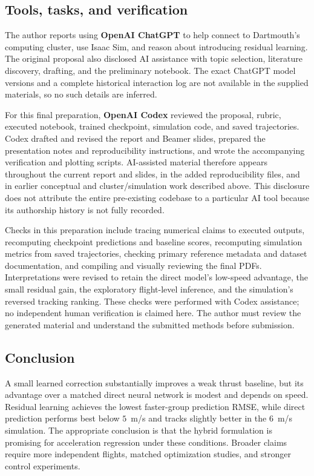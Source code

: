 \documentclass[10pt,letterpaper]{article}
\begin{document}
\subsection{Tools, tasks, and verification}
The author reports using \textbf{OpenAI ChatGPT} to help connect to Dartmouth's computing cluster, use Isaac Sim, and reason about introducing residual learning. The original proposal also disclosed AI assistance with topic selection, literature discovery, drafting, and the preliminary notebook. The exact ChatGPT model versions and a complete historical interaction log are not available in the supplied materials, so no such details are inferred.

For this final preparation, \textbf{OpenAI Codex} reviewed the proposal, rubric, executed notebook, trained checkpoint, simulation code, and saved trajectories. Codex drafted and revised the report and Beamer slides, prepared the presentation notes and reproducibility instructions, and wrote the accompanying verification and plotting scripts. AI-assisted material therefore appears throughout the current report and slides, in the added reproducibility files, and in earlier conceptual and cluster/simulation work described above. This disclosure does not attribute the entire pre-existing codebase to a particular AI tool because its authorship history is not fully recorded.

Checks in this preparation include tracing numerical claims to executed outputs, recomputing checkpoint predictions and baseline scores, recomputing simulation metrics from saved trajectories, checking primary reference metadata and dataset documentation, and compiling and visually reviewing the final PDFs. Interpretations were revised to retain the direct model's low-speed advantage, the small residual gain, the exploratory flight-level inference, and the simulation's reversed tracking ranking. These checks were performed with Codex assistance; no independent human verification is claimed here. The author must review the generated material and understand the submitted methods before submission.

\subsection{Conclusion}
A small learned correction substantially improves a weak thrust baseline, but its advantage over a matched direct neural network is modest and depends on speed. Residual learning achieves the lowest faster-group prediction RMSE, while direct prediction performs best below $5$~m/s and tracks slightly better in the 6~m/s simulation. The appropriate conclusion is that the hybrid formulation is promising for acceleration regression under these conditions. Broader claims require more independent flights, matched optimization studies, and stronger control experiments.



\end{document}
